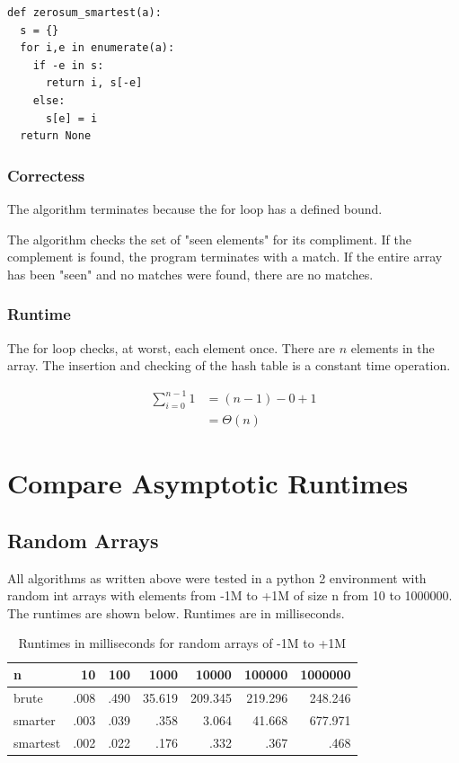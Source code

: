 \documentclass[11pt]{article}
\begin{document}
\lstset{language=Python,label= ,caption= ,numbers=none}
\begin{lstlisting}
def zerosum_smartest(a):
  s = {}
  for i,e in enumerate(a):
    if -e in s:
      return i, s[-e]
    else:
      s[e] = i
  return None
\end{lstlisting}

\subsubsection{Correctess}
\label{sec-1-3-1}

The algorithm terminates because the for loop has a defined bound.

The algorithm checks the set of "seen elements" for its compliment. If
the complement is found, the program terminates with a match. If the
entire array has been "seen" and no matches were found, there are no
matches.

\subsubsection{Runtime}
\label{sec-1-3-2}

The for loop checks, at worst, each element once. There are $n$
elements in the array. The insertion and checking of the hash table is
a constant time operation.

\begin{align}
\sum_{i=0}^{n-1} 1 &= (n-1) - 0 + 1 \\
&= \Theta (n)
\end{align}

\section{Compare Asymptotic Runtimes}
\label{sec-2}

\subsection{Random Arrays}
\label{sec-2-1}

All algorithms as written above were tested in a python 2 environment
with random int arrays with elements from -1M to +1M of size n
from 10 to 1000000. The runtimes are shown below. Runtimes are in
milliseconds.

\begin{table}[htb]
\caption{Runtimes in milliseconds for random arrays of -1M to +1M}
\centering
\begin{tabular}{lrrrrrr}
n & 10 & 100 & 1000 & 10000 & 100000 & 1000000\\
\hline
brute & .008 & .490 & 35.619 & 209.345 & 219.296 & 248.246\\
smarter & .003 & .039 & .358 & 3.064 & 41.668 & 677.971\\
smartest & .002 & .022 & .176 & .332 & .367 & .468\\
\end{tabular}
\end{table}
\end{document}

